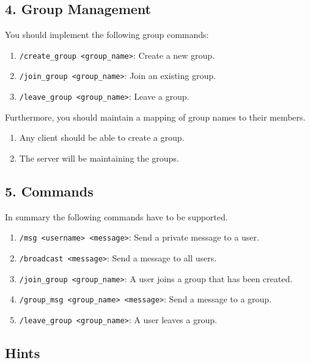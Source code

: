 \documentclass[12pt,a4paper]{article}
\begin{document}
\subsection*{4. Group Management}
You should implement the following group commands:
    \begin{enumerate}
        \item \texttt{/create\_group <group\_name>}: Create a new group.
        \item \texttt{/join\_group <group\_name>}: Join an existing group.
        \item \texttt{/leave\_group <group\_name>}: Leave a group.
    \end{enumerate}
Furthermore, you should maintain a mapping of group names to their members.
\begin{enumerate}
\item Any client should be able to create a group. 
\item The server will be maintaining the groups.
\end{enumerate}



\subsection*{5. Commands}
In summary the following commands have to be supported. 
\begin{enumerate}
    \item \texttt{/msg <username> <message>}: Send a private message to a user.
    \item \texttt{/broadcast <message>}: Send a message to all users.
    \item \texttt{/join\_group <group\_name>}: A user joins a group that has been created.
    \item \texttt{/group\_msg <group\_name> <message>}: Send a message to a group.
    \item \texttt{/leave\_group <group\_name>}: A user leaves a group.
\end{enumerate}

\subsection*{Hints}
\end{document}
